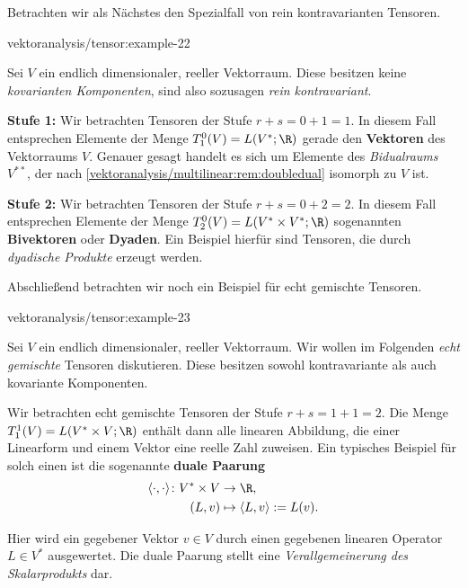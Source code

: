 \documentclass[letterpaper,10pt,english]{jupyterBook}
\begin{document}
\par
Betrachten wir als Nächstes den Spezialfall von rein kontravarianten Tensoren.
\begin{example}{}{vektoranalysis/tensor:example-22}



\par
Sei \(V\) ein endlich dimensionaler, reeller Vektorraum.
Diese besitzen keine \emph{kovarianten Komponenten}, sind also sozusagen \emph{rein kontravariant}.

\par
\textbf{Stufe 1:}
Wir betrachten Tensoren der Stufe \(r+s=0+1=1\).
In diesem Fall entsprechen Elemente der Menge \(T^0_1(V) = L(V^\ast; \R)\) gerade den \textbf{Vektoren} des Vektorraums \(V\).
Genauer gesagt handelt es sich um Elemente des \emph{Bidualraums} \(V^{**}\), der nach \cref{vektoranalysis/multilinear:rem:doubledual} isomorph zu \(V\) ist.

\par
\textbf{Stufe 2:}
Wir betrachten Tensoren der Stufe \(r+s=0+2=2\).
In diesem Fall entsprechen Elemente der Menge \(T^0_2(V) = L(V^\ast \times V^\ast; \R)\) sogenannten \textbf{Bivektoren} oder \textbf{Dyaden}.
Ein Beispiel hierfür sind Tensoren, die durch \emph{dyadische Produkte} erzeugt werden.
\end{example}

\par
Abschließend betrachten wir noch ein Beispiel für echt gemischte Tensoren.
\begin{example}{}{vektoranalysis/tensor:example-23}



\par
Sei \(V\) ein endlich dimensionaler, reeller Vektorraum.
Wir wollen im Folgenden \emph{echt gemischte} Tensoren diskutieren.
Diese besitzen sowohl kontravariante als auch kovariante Komponenten.

\par
Wir betrachten echt gemischte Tensoren der Stufe \(r+s=1+1=2\).
Die Menge \(T^1_1(V) = L(V^\ast \times V; \R)\) enthält dann alle linearen Abbildung, die einer Linearform und einem Vektor eine reelle Zahl zuweisen.
Ein typisches Beispiel für solch einen ist die sogenannte \textbf{duale Paarung}
\begin{align*}
\langle \cdot, \cdot \rangle \colon V^\ast \times V &\rightarrow \R,\\
(L, v) &\mapsto \langle L, v \rangle := L(v).
\end{align*}
\par
Hier wird ein gegebener Vektor \(v \in V\) durch einen gegebenen linearen Operator \(L \in V^\ast\) ausgewertet.
Die duale Paarung stellt eine \emph{Verallgemeinerung des Skalarprodukts} dar.
\end{example}
\end{document}
